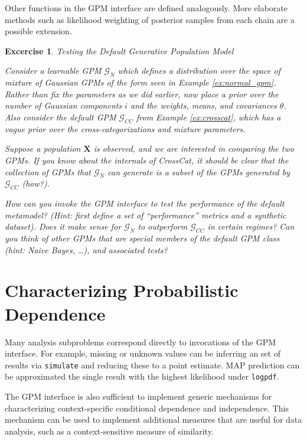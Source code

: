 \documentclass[10pt,letterpaper]{article}
\newtheorem{excercise}{Excercise}[section]
\begin{document}
Other functions in the GPM interface are defined analogously. More elaborate methods such as likelihood weighting of posterior samples from each chain are a possible extension.

\begin{excercise} \label{ex:normal_vs_normal} Testing the Default Generative Population Model

    Consider a learnable GPM $\mathcal{G}_N$ which defines a distribution over the space of mixture of Gaussian GPMs of the form seen in Example \ref{ex:normal_gpm}. Rather than fix the parameters as we did earlier, now place a prior over the number of Gaussian components $i$ and the weights, means, and covariances $\theta$. Also consider the default GPM $\mathcal{G}_{CC}$ from Example \ref{ex:crosscat}, which has a vague prior over the cross-categorizations and mixture parameters.

    Suppose a population $\mathbf{X}$ is observed, and we are interested in comparing the two GPMs. If you know about the internals of CrossCat, it should be clear that the collection of GPMs that $\mathcal{G}_N$ can generate is a subset of the GPMs generated by $\mathcal{G}_{CC}$ (how?).

    How can you invoke the GPM interface to test the performance of the default metamodel? (Hint: first define a set of ``performance'' metrics and a synthetic dataset). Does it make sense for $\mathcal{G}_N$ to outperform $\mathcal{G}_{CC}$ in certain regimes? Can you think of other GPMs that are special members of the default GPM class (hint: Naive Bayes, \dots), and associated tests?
\end{excercise}

\section{Characterizing Probabilistic Dependence}

Many analysis subproblems correspond directly to invocations of the GPM interface. For example, missing or unknown values can be inferring an set of results via \texttt{simulate} and reducing these to a point estimate. MAP prediction can be approximated the single result with the highest likelihood under \texttt{logpdf}.

The GPM interface is also sufficient to implement generic mechanisms for characterizing context-specific conditional dependence and independence. This mechanism can be used to implement additional measures that are useful for data analysis, such as a context-sensitive measure of similarity.
\end{document}
